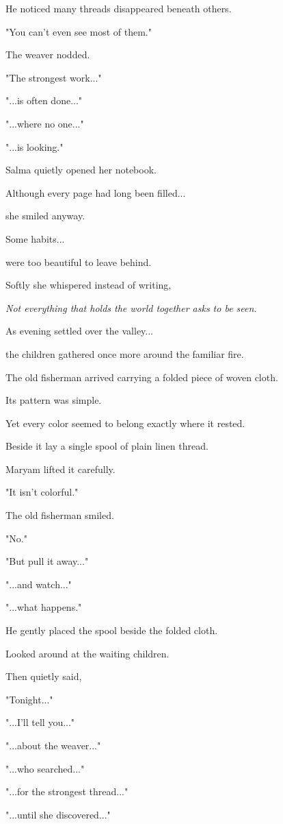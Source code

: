 \documentclass[12pt,openany]{book}
\begin{document}
He noticed many threads disappeared beneath others.

"You can't even see most of them."

The weaver nodded.

"The strongest work..."

"...is often done..."

"...where no one..."

"...is looking."

Salma quietly opened her notebook.

Although every page had long been filled...

she smiled anyway.

Some habits...

were too beautiful to leave behind.

Softly she whispered instead of writing,

\emph{Not everything that holds the world together asks to be seen.}

As evening settled over the valley...

the children gathered once more around the familiar fire.

The old fisherman arrived carrying a folded piece of woven cloth.

Its pattern was simple.

Yet every color seemed to belong exactly where it rested.

Beside it lay a single spool of plain linen thread.

Maryam lifted it carefully.

"It isn't colorful."

The old fisherman smiled.

"No."

"But pull it away..."

"...and watch..."

"...what happens."

He gently placed the spool beside the folded cloth.

Looked around at the waiting children.

Then quietly said,

"Tonight..."

"...I'll tell you..."

"...about the weaver..."

"...who searched..."

"...for the strongest thread..."

"...until she discovered..."
\end{document}
